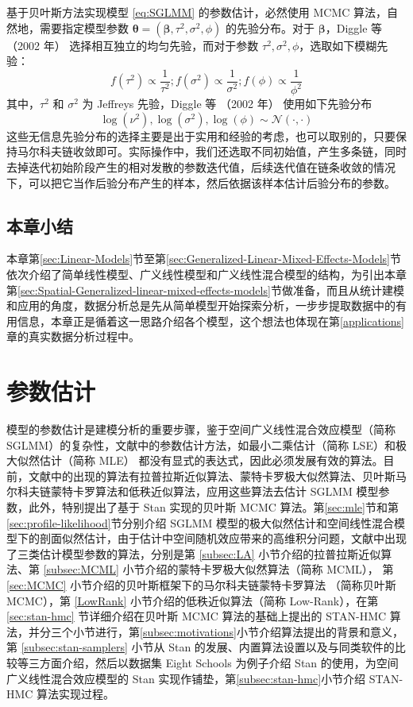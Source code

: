 \documentclass[12pt,a4paper,UTF8,twoside]{book}
\theoremstyle{definition}
\theoremstyle{definition}
\theoremstyle{definition}
\theoremstyle{remark}
\begin{document}
基于贝叶斯方法实现模型 \eqref{eq:SGLMM} 的参数估计，必然使用 MCMC
算法，自然地，需要指定模型参数
\(\boldsymbol{\theta} = (\boldsymbol{\beta},\tau^2,\sigma^2,\phi)\)
的先验分布。对于 \(\boldsymbol{\beta}\)，Diggle 等 （2002 年）
\citep{Diggle2002Childhood} 选择相互独立的均匀先验，而对于参数
\(\tau^2,\sigma^2,\phi\)，选取如下模糊先验：
\[f(\tau^2) \propto \frac{1}{\tau^2};f(\sigma^2) \propto \frac{1}{\sigma^2};f(\phi) \propto \frac{1}{\phi^2}\]
\noindent 其中，\(\tau^2\) 和 \(\sigma^2\) 为 Jeffreys 先验，Diggle 等
（2002 年） \citep{Diggle2002Childhood} 使用如下先验分布
\begin{equation*}
\log(\nu^2),\log(\sigma^2),\log(\phi)  \sim \mathcal{N}(\cdot,\cdot)
\end{equation*}
这些无信息先验分布的选择主要是出于实用和经验的考虑，也可以取别的，只要保持马尔科夫链收敛即可。实际操作中，我们还选取不同初始值，产生多条链，同时去掉迭代初始阶段产生的相对发散的参数迭代值，后续迭代值在链条收敛的情况下，可以把它当作后验分布产生的样本，然后依据该样本估计后验分布的参数。

\hypertarget{sec:models}{%
\section{本章小结}\label{sec:models}}

本章第\ref{sec:Linear-Models}节至第\ref{sec:Generalized-Linear-Mixed-Effects-Models}节依次介绍了简单线性模型、广义线性模型和广义线性混合模型的结构，为引出本章第\ref{sec:Spatial-Generalized-linear-mixed-effects-models}节做准备，而且从统计建模和应用的角度，数据分析总是先从简单模型开始探索分析，一步步提取数据中的有用信息，本章正是循着这一思路介绍各个模型，这个想法也体现在第\ref{applications}章的真实数据分析过程中。

\hypertarget{algorithms}{%
\chapter{参数估计}\label{algorithms}}

模型的参数估计是建模分析的重要步骤，鉴于空间广义线性混合效应模型（简称
SGLMM）的复杂性，文献中的参数估计方法，如最小二乘估计（简称
LSE）和极大似然估计（简称 MLE）
都没有显式的表达式，因此必须发展有效的算法。目前，文献中的出现的算法有拉普拉斯近似算法、蒙特卡罗极大似然算法、贝叶斯马尔科夫链蒙特卡罗算法和低秩近似算法，应用这些算法去估计
SGLMM 模型参数，此外，特别提出了基于 Stan 实现的贝叶斯 MCMC
算法。第\ref{sec:mle}节和第\ref{sec:profile-likelihood}节分别介绍 SGLMM
模型的极大似然估计和空间线性混合模型下的剖面似然估计，由于估计中空间随机效应带来的高维积分问题，文献中出现了三类估计模型参数的算法，分别是第
\ref{subsec:LA} 小节介绍的拉普拉斯近似算法、第 \ref{subsec:MCML}
小节介绍的蒙特卡罗极大似然算法（简称 MCML）， 第 \ref{sec:MCMC}
小节介绍的贝叶斯框架下的马尔科夫链蒙特卡罗算法 （简称贝叶斯 MCMC），第
\ref{LowRank} 小节介绍的低秩近似算法（简称 Low-Rank），在第
\ref{sec:stan-hmc} 节详细介绍在贝叶斯 MCMC 算法的基础上提出的 STAN-HMC
算法，并分三个小节进行，第\ref{subsec:motivations}小节介绍算法提出的背景和意义，第
\ref{subsec:stan-samplers} 小节从 Stan
的发展、内置算法设置以及与同类软件的比较等三方面介绍，然后以数据集 Eight
Schools 为例子介绍 Stan 的使用，为空间广义线性混合效应模型的 Stan
实现作铺垫，第\ref{subsec:stan-hmc}小节介绍 STAN-HMC 算法实现过程。
\end{document}
